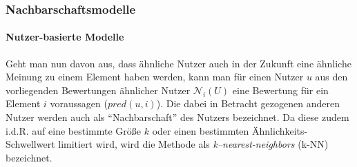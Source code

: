 \subsubsection{Nachbarschaftsmodelle}\newpage

\paragraph{Nutzer-basierte Modelle} Geht man nun davon aus, dass ähnliche Nutzer auch in der Zukunft eine ähnliche Meinung zu einem Element haben werden, kann man für einen Nutzer $u$ aus den vorliegenden Bewertungen ähnlicher Nutzer $\mathcal{N}_i(U)$ eine Bewertung für ein Element $i$ voraussagen ($pred(u,i)$). Die dabei in Betracht gezogenen anderen Nutzer werden auch als ``Nachbarschaft'' des Nutzers bezeichnet. Da diese zudem i.d.R. auf eine bestimmte Größe $k$ oder einen bestimmten Ähnlichkeits-Schwellwert limitiert wird, wird die Methode als \textit{k--nearest-neighbors} (k-NN) bezeichnet.


